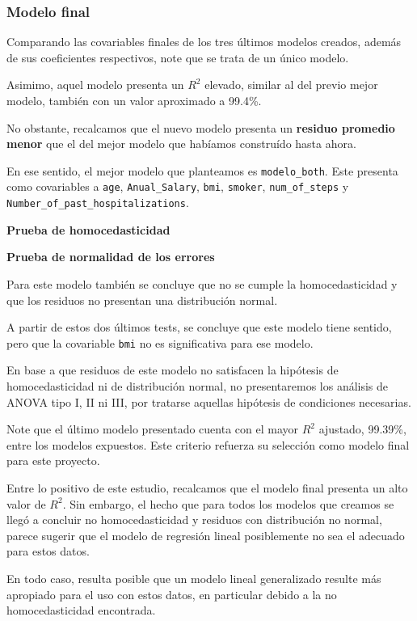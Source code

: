\documentclass[
]{article}
\begin{document}
\subsubsection{Modelo final}\label{modelo-final}

Comparando las covariables finales de los tres últimos modelos creados,
además de sus coeficientes respectivos, note que se trata de un único
modelo.

Asimimo, aquel modelo presenta un \(R^2\) elevado, similar al del previo
mejor modelo, también con un valor aproximado a 99.4\%.

No obstante, recalcamos que el nuevo modelo presenta un \textbf{residuo
promedio menor} que el del mejor modelo que habíamos construído hasta
ahora.

En ese sentido, el mejor modelo que planteamos es \texttt{modelo\_both}.
Este presenta como covariables a \texttt{age}, \texttt{Anual\_Salary},
\texttt{bmi}, \texttt{smoker}, \texttt{num\_of\_steps} y
\texttt{Number\_of\_past\_hospitalizations}.

\textbf{Prueba de homocedasticidad}

\textbf{Prueba de normalidad de los errores}

Para este modelo también se concluye que no se cumple la
homocedasticidad y que los residuos no presentan una distribución
normal.

A partir de estos dos últimos tests, se concluye que este modelo tiene
sentido, pero que la covariable \texttt{bmi} no es significativa para
ese modelo.

En base a que residuos de este modelo no satisfacen la hipótesis de
homocedasticidad ni de distribución normal, no presentaremos los
análisis de ANOVA tipo I, II ni III, por tratarse aquellas hipótesis de
condiciones necesarias.

Note que el último modelo presentado cuenta con el mayor \(R^2\)
ajustado, 99.39\%, entre los modelos expuestos. Este criterio refuerza
su selección como modelo final para este proyecto.

Entre lo positivo de este estudio, recalcamos que el modelo final
presenta un alto valor de \(R^2\). Sin embargo, el hecho que para todos
los modelos que creamos se llegó a concluir no homocedasticidad y
residuos con distribución no normal, parece sugerir que el modelo de
regresión lineal posiblemente no sea el adecuado para estos datos.

En todo caso, resulta posible que un modelo lineal generalizado resulte
más apropiado para el uso con estos datos, en particular debido a la no
homocedasticidad encontrada.
\end{document}
